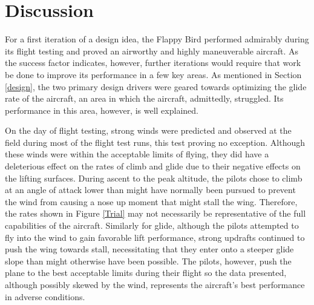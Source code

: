 \documentclass[titlepage]{article}
\begin{document}
\section{Discussion}
For a first iteration of a design idea, the Flappy Bird performed admirably during its flight testing and proved an airworthy and highly maneuverable aircraft. As the success factor indicates, however, further iterations would require that work be done to improve its performance in a few key areas. As mentioned in Section \ref{design}, the two primary design drivers were geared towards optimizing the glide rate of the aircraft, an area in which the aircraft, admittedly, struggled. Its performance in this area, however, is well explained.

On the day of flight testing, strong winds were predicted and observed at the field during most of the flight test runs, this test proving no exception. Although these winds were within the acceptable limits of flying, they did have a deleterious effect on the rates of climb and glide due to their negative effects on the lifting surfaces. During ascent to the peak altitude, the pilots chose to climb at an angle of attack lower than might have normally been pursued to prevent the wind from causing a nose up moment that might stall the wing. Therefore, the rates shown in Figure \ref{Trial} may not necessarily be representative of the full capabilities of the aircraft. Similarly for glide, although the pilots attempted to fly into the wind to gain favorable lift performance, strong updrafts continued to push the wing towards stall, necessitating that they enter onto a steeper glide slope than might otherwise have been possible. The pilots, however, push the plane to the best acceptable limits during their flight so the data presented, although possibly skewed by the wind, represents the aircraft's best performance in adverse conditions.
\end{document}
